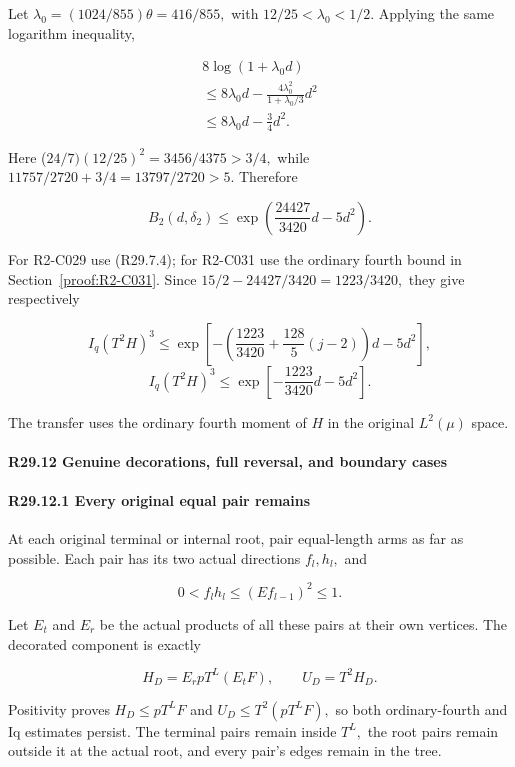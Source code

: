 Let \(\lambda_0=(1024/855)\theta=416/855,\allowbreak \) with
\(12/25<\lambda_0<1/2.\) Applying the same logarithm inequality,

\[
\begin{gathered}
8\log(1+\lambda_0d)\\
\le8\lambda_0d-\frac{4\lambda_0^2}{1+\lambda_0/3}d^2\\
\le8\lambda_0d-\frac34d^2.
\end{gathered}
\]

Here (\(24/7)(12/25)^2=3456/4375>3/4,\allowbreak \) while
\(11757/2720+3/4=13797/2720>5.\) Therefore

\[
B_2(d,\delta_2)\le
\exp\left(\frac{24427}{3420}d-5d^2\right).
\tag{R29.11.6}\label{eq:unit-output:curvature}
\]

For R2-C029 use (R29.7.4); for R2-C031 use the ordinary fourth bound in Section~\ref{proof:R2-C031}. Since
\(15/2-24427/3420=1223/3420,\allowbreak \) they give respectively

\[
I_q(T^2H)^3\le
\exp\left[-\left(\frac{1223}{3420}+
\frac{128}{5}(j-2)\right)d-5d^2\right],\tag{R29.11.7}
\]
\[
I_q(T^2H)^3\le
\exp\left[-\frac{1223}{3420}d-5d^2\right].
\tag{R29.11.8}
\]

The transfer uses the ordinary fourth moment of $H$ in the original $L^2(\mu)$ space.

\paragraph{R29.12 Genuine decorations, full reversal, and boundary cases}

\paragraph{R29.12.1 Every original equal pair remains}

At each original terminal or internal root, pair equal-length arms
as far as possible. Each pair has its two actual directions \(f_l,\allowbreak  h_l,\allowbreak \)
and

\[
0<f_lh_l\le(Ef_{l-1})^2\le1.
\]

Let \(E_t\) and \(E_r\) be the actual products of all these pairs at their
own vertices. The decorated component is exactly

\[
H_D=E_r pT^L(E_tF),\qquad U_D=T^2H_D.
\tag{R29.12.1}
\]

Positivity proves \(H_D\le pT^LF\) and \(U_D\le T^2(pT^LF),\allowbreak \) so both
ordinary-fourth and Iq estimates persist. The terminal pairs remain
inside \(T^L,\allowbreak \) the root pairs remain outside it at the actual root,
and every pair's edges remain in the tree. 

